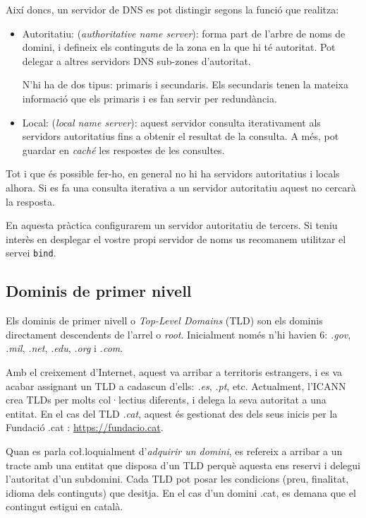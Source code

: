 \documentclass{practicaitic}
\begin{document}
Així doncs, un servidor de DNS es pot distingir segons la funció que realitza:

\begin{itemize}
  \item Autoritatiu: (\textit{authoritative name server}): forma part de l'arbre
    de noms de domini, i defineix
    els continguts de la zona en la que hi té autoritat. Pot delegar a altres
    servidors DNS sub-zones d'autoritat.

    N'hi ha de dos tipus: primaris i secundaris. Els secundaris tenen la mateixa
    informació que els primaris i es fan servir per redundància.
  \item Local: (\textit{local name server}): aquest servidor consulta iterativament
    als servidors autoritatius fins a obtenir el resultat de la consulta. A més, pot
    guardar en \textit{caché} les respostes de les consultes.
\end{itemize}

Tot i que és possible fer-ho, en general no hi ha servidors autoritatius
i locals alhora. Si es fa una consulta iterativa a un servidor autoritatiu aquest
no cercarà la resposta.

En aquesta pràctica configurarem un servidor autoritatiu de tercers. Si teniu
interès en desplegar el vostre propi servidor de noms us recomanem utilitzar
el servei \texttt{bind}.

\subsection{Dominis de primer nivell}

Els dominis de primer nivell o \textit{Top-Level Domains} (TLD) son els dominis
directament descendents de l'arrel o \textit{root}. Inicialment només n'hi havien
6: \textit{.gov}, \textit{.mil}, \textit{.net}, \textit{.edu}, \textit{.org} i \textit{.com}.

Amb el creixement d'Internet, aquest va arribar a territoris estrangers, i es va acabar
assignant un TLD a cadascun d'ells: \textit{.es}, \textit{.pt}, etc. Actualment,
l'ICANN crea TLDs per molts col·lectius diferents, i delega la seva
autoritat a una entitat. En el cas del TLD \textit{.cat}, aquest és gestionat des
dels seus inicis per la Fundació .cat : \url{https://fundacio.cat}.

Quan es parla co\l.loquialment d'\textit{adquirir un domini}, es refereix
a arribar a un tracte amb una entitat que disposa d'un TLD perquè aquesta
ens reservi i delegui l'autoritat d'un subdomini. Cada TLD pot posar les
condicions (preu, finalitat, idioma dels continguts) que desitja. En el cas
d'un domini .cat, es demana que el contingut estigui en català.
\end{document}
